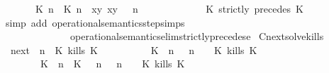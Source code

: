 \begin{isabellebody}
\ \ \ \ {\isasymsupseteq}\ {\isacharbraceleft}\ {\isacharparenleft}{\isacharparenleft}{\isasymlceil}{\isacharhash}\isactrlsup {\isasymle}\ K\ n{\isacharcomma}\ {\isacharhash}\isactrlsup {\isacharless}\ K\ n{\isasymrceil}\ {\isasymin}\ {\isacharparenleft}{\isasymlambda}{\isacharparenleft}x{\isacharcomma}y{\isacharparenright}{\isachardot}\ x{\isasymle}y{\isacharparenright}{\isacharparenright}\ {\isacharhash}\ {\isasymGamma}{\isacharparenright}{\isacharcomma}\ n\isanewline
\ \ \ \ \ \ \ \ \ \ {\isasymturnstile}\ {\isasymPsi}\ {\isasymtriangleright}\ {\isacharparenleft}{\isacharparenleft}K\ strictly\ precedes\ K\ {\isacharhash}\ {\isasymPhi}{\isacharparenright}\ {\isacharbraceright}{\isacartoucheclose}\isanewline
%
\isadelimproof
%
\endisadelimproof
%
\isatagproof
{}\isamarkupfalse%
\ {\isacharparenleft}simp\ add{\isacharcolon}\ operational{\isacharunderscore}semantics{\isacharunderscore}step{\isachardot}simps\isanewline
\ \ \ \ \ \ \ \ \ \ \ \ \ \ operational{\isacharunderscore}semantics{\isacharunderscore}elim{\isachardot}strictly{\isacharunderscore}precedes{\isacharunderscore}e{\isacharparenright}%
\endisatagproof
{\isafoldproof}%
%
\isadelimproof
\isanewline
%
\endisadelimproof
\isanewline
{}\isamarkupfalse%
\ Cnext{\isacharunderscore}solve{\isacharunderscore}kills{\isacharcolon}\isanewline
\ \ {\isacartoucheopen}{\isacharparenleft}{\isasymC}\isactrlsub n\isactrlsub e\isactrlsub x\isactrlsub t\ {\isacharparenleft}{\isasymGamma}{\isacharcomma}\ n\ {\isasymturnstile}\ {\isacharparenleft}{\isacharparenleft}K\ kills\ K\ {\isacharhash}\ {\isasymPsi}{\isacharparenright}\ {\isasymtriangleright}\ {\isasymPhi}{\isacharparenright}{\isacharparenright}\isanewline
\ \ \ \ {\isasymsupseteq}\ {\isacharbraceleft}\ {\isacharparenleft}{\isacharparenleft}K\ {\isasymnot}{\isasymUp}\ n{\isacharparenright}\ {\isacharhash}\ {\isasymGamma}{\isacharparenright}{\isacharcomma}\ n\ {\isasymturnstile}\ {\isasymPsi}\ {\isasymtriangleright}\ {\isacharparenleft}{\isacharparenleft}K\ kills\ K\ {\isacharhash}\ {\isasymPhi}{\isacharparenright}{\isacharcomma}\isanewline
\ \ \ \ \ \ \ \ {\isacharparenleft}{\isacharparenleft}K\ {\isasymUp}\ n{\isacharparenright}\ {\isacharhash}\ {\isacharparenleft}K\ {\isasymnot}{\isasymUp}\ {\isasymge}\ n{\isacharparenright}\ {\isacharhash}\ {\isasymGamma}{\isacharparenright}{\isacharcomma}\ n\ {\isasymturnstile}\ {\isasymPsi}\ {\isasymtriangleright}\ {\isacharparenleft}{\isacharparenleft}K\ kills\ K\ {\isacharhash}\ {\isasymPhi}{\isacharparenright}\ {\isacharbraceright}{\isacartoucheclose}\isanewline

\end{isabellebody}
